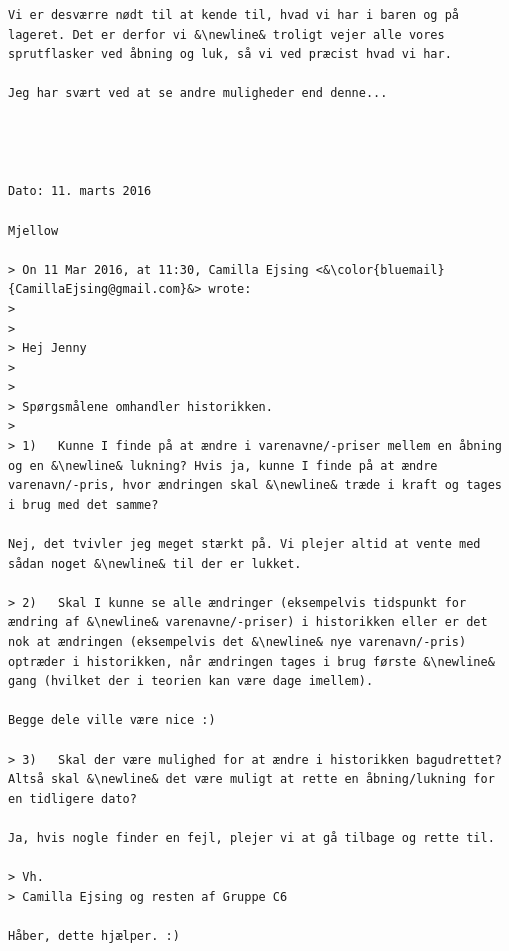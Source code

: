 \documentclass[]{article}
\begin{document}
\begin{lstlisting}[language=Gmail]
Vi er desværre nødt til at kende til, hvad vi har i baren og på lageret. Det er derfor vi &\newline& troligt vejer alle vores sprutflasker ved åbning og luk, så vi ved præcist hvad vi har.

Jeg har svært ved at se andre muligheder end denne...




Dato: 11. marts 2016

Mjellow

> On 11 Mar 2016, at 11:30, Camilla Ejsing <&\color{bluemail}{CamillaEjsing@gmail.com}&> wrote:
>
>
> Hej Jenny
>
>
> Spørgsmålene omhandler historikken.
>
> 1)   Kunne I finde på at ændre i varenavne/-priser mellem en åbning og en &\newline& lukning? Hvis ja, kunne I finde på at ændre varenavn/-pris, hvor ændringen skal &\newline& træde i kraft og tages i brug med det samme?

Nej, det tvivler jeg meget stærkt på. Vi plejer altid at vente med sådan noget &\newline& til der er lukket.

> 2)   Skal I kunne se alle ændringer (eksempelvis tidspunkt for ændring af &\newline& varenavne/-priser) i historikken eller er det nok at ændringen (eksempelvis det &\newline& nye varenavn/-pris) optræder i historikken, når ændringen tages i brug første &\newline& gang (hvilket der i teorien kan være dage imellem).

Begge dele ville være nice :)

> 3)   Skal der være mulighed for at ændre i historikken bagudrettet? Altså skal &\newline& det være muligt at rette en åbning/lukning for en tidligere dato?

Ja, hvis nogle finder en fejl, plejer vi at gå tilbage og rette til.

> Vh.
> Camilla Ejsing og resten af Gruppe C6

Håber, dette hjælper. :)
\end{lstlisting}
\end{document}
